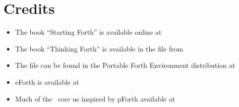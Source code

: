 \documentclass{article}
\begin{document}
\section*{Credits}

\begin{itemize}
\item The book ``Starting Forth'' is available online at
\item The book ``Thinking Forth'' is available in the file
       from
\item The file  can be found in the Portable Forth
      Environment distribution at 
\item eForth is available at 
\item Much of the \M\  core us inspired by pForth available at
\end{itemize}
\end{document}
